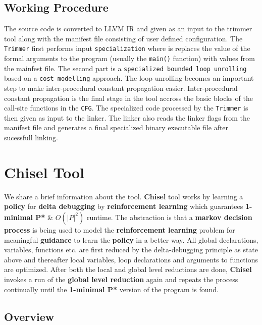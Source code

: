 \documentclass{relatorio}
\begin{document}
\subsection{Working Procedure}%
\label{Tools}

The source code is converted to LLVM IR  and given as an input to the trimmer tool along with the manifest file consisting of user defined configuration. The \texttt{Trimmer} first performs input \texttt{specialization} where is replaces the value of the formal arguments to the program (usually the \texttt{main()} function) with values from the mainfest file. The second part is a \texttt{specialized bounded loop unrolling} based on a \texttt{cost modelling} approach. The loop unrolling becomes an important step to make inter-procedural constant propagation easier. Inter-procedural constant propagation is the final stage in the tool accross the basic blocks of the call-site functions in the \texttt{CFG}. The specialized code processed by the \texttt{Trimmer} is then given as input to the linker. The linker also reads the linker flags from the manifest file and generates a final specialized binary executable file after sucessfull linking.

\section{Chisel Tool}%
\label{Tools}

We share a brief information about the tool. \textbf{Chisel} tool works by learning a \textbf{policy} for \textbf{delta debugging} by \textbf{reinforcement learning} which guarantees \textbf{1-minimal P*} \& $\textbf{$O(|P|^2)$}$ runtime. The abstraction is that a \textbf{markov decision process} is being used to model the \textbf{reinforcement learning} problem for meaningful \textbf{guidance} to learn the \textbf{policy} in a better way. All global declarations, variables, functions etc. are first reduced by the delta-debugging principle as state above and thereafter local variables, loop declarations and arguments to functions are optimized. After both the local and global level reductions are done, \textbf{Chisel} invokes a run of the \textbf{global level reduction} again and repeats the process continually until the \textbf{1-minimal P*} version of the program is found. 

\subsection{Overview}%
\label{Tools}
\end{document}
